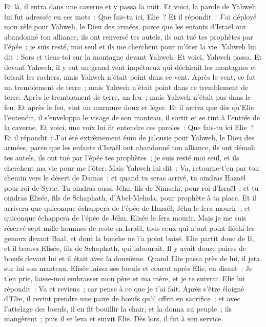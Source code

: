 \begin{multicols}{2}
Et là, il entra dans une caverne et y passa la nuit. Et voici, la parole de Yahweh lui fut adressée en ces mots~: Que fais-tu ici, Elie~?
Et il répondit~: J'ai déployé mon zèle pour Yahweh, le Dieu des armées, parce que les enfants d'Israël ont abandonné ton alliance, ils ont renversé tes autels, ils ont tué tes prophètes par l'épée~; je suis resté, moi seul et ils me cherchent pour m'ôter la vie.
Yahweh lui dit~: Sors et tiens-toi sur la montagne devant Yahweh. Et voici, Yahweh passa. Et devant Yahweh, il y eut un grand vent impétueux qui déchirait les montagnes et brisait les rochers, mais Yahweh n'était point dans ce vent. Après le vent, ce fut un tremblement de terre~; mais Yahweh n'était point dans ce tremblement de terre.
Après le tremblement de terre, un feu~; mais Yahweh n'était pas dans le feu. Et après le feu, vint un murmure doux et léger.
Et il arriva que dès qu'Elie l'entendit, il s'enveloppa le visage de son manteau, il sortit et se tint à l'entrée de la caverne. Et voici, une voix lui fit entendre ces paroles~: Que fais-tu ici Elie~?
Et il répondit~: J'ai été extrêmement ému de jalousie pour Yahweh, le Dieu des armées, parce que les enfants d'Israël ont abandonné ton alliance, ils ont démoli tes autels, ils ont tué par l'épée tes prophètes~; je suis resté moi seul, et ils cherchent ma vie pour me l'ôter.
Mais Yahweh lui dit~: Va, retourne-t'en par ton chemin vers le désert de Damas~; et quand tu seras arrivé, tu oindras Hazaël pour roi de Syrie.
Tu oindras aussi Jéhu, fils de Nimschi, pour roi d'Israël~; et tu oindras Elisée, fils de Schaphath, d'Abel-Mehola, pour prophète à ta place.
Et il arrivera que quiconque échappera de l'épée de Hazaël, Jéhu le fera mourir~; et quiconque échappera de l'épée de Jéhu, Elisée le fera mourir.
Mais je me suis réservé sept mille hommes de reste en Israël, tous ceux qui n'ont point fléchi les genoux devant Baal, et dont la bouche ne l'a point baisé.
Elie partit donc de là, et il trouva Elisée, fils de Schaphath, qui labourait. Il y avait douze paires de bœufs devant lui et il était avec la douzième. Quand Elie passa près de lui, il jeta sur lui son manteau.
Elisée laissa ses bœufs et courut après Elie, en disant~: Je t'en prie, laisse-moi embrasser mon père et ma mère, et je te suivrai. Elie lui répondit~: Va et reviens~; car pense à ce que je t'ai fait.
Après s'être éloigné d'Elie, il revint prendre une paire de bœufs qu'il offrit en sacrifice~; et avec l'attelage des bœufs, il en fit bouillir la chair, et la donna au peuple~; ils mangèrent~; puis il se leva et suivit Elie. Dès lors, il fut à son service.

\end{multicols}
